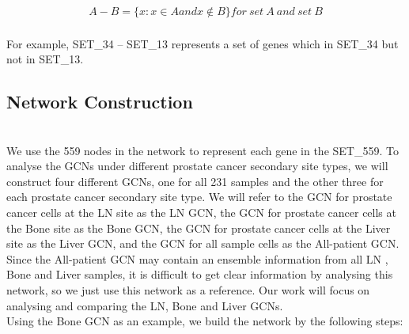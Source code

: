 \documentclass[12pt,a4paper]{report}
\begin{document}
\begin{gather*} 
	    A - B = \{x: x \in A and x \notin B\} for \ set \ A \ and \ set \ B
\end{gather*}\\

For example, SET\_34 – SET\_13 represents a set of genes which in SET\_34 but not in SET\_13.

\subsection{Network Construction }\\

We use the 559 nodes in the network to represent each gene in the SET\_559. To analyse the GCNs under different prostate cancer secondary site types, we will construct four different GCNs, one for all 231 samples and the other three for each prostate cancer secondary site type. We will refer to the GCN for prostate cancer cells at the LN site as the LN GCN, the GCN for prostate cancer cells at the Bone site as the Bone GCN, the GCN for prostate cancer cells at the Liver site as the Liver GCN, and the GCN for all sample cells as the All-patient GCN. Since the All-patient GCN may contain an ensemble information from all LN , Bone and Liver samples, it is difficult to get clear information by analysing this network, so we just use this network as a reference. Our work will focus on analysing and comparing the LN, Bone and Liver GCNs.\\

Using the Bone GCN as an example, we build the network by the following steps: \\
\end{document}
